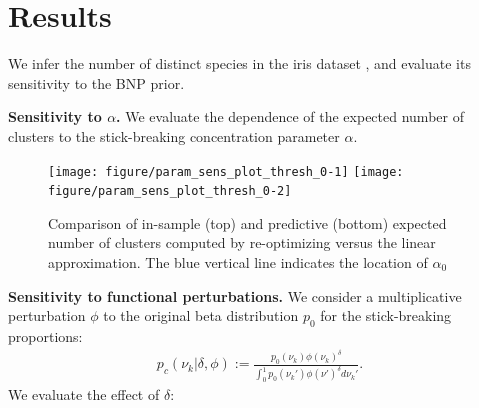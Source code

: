 \documentclass[a0,plainsections,30pt]{sciposter}\usepackage[]{graphicx}\usepackage[]{color}
\newenvironment{knitrout}{}{} %
\newcommand{\Expect}{\mathbb{E}}
\newcommand{\etazopt}{\eta_z^{*}}
\newcommand{\etathetaopt}{\eta_\theta^{*}}
\newcommand{\QExpect}
{\Expect_{q\left(\theta, z \vert \eta_\theta, \etazopt(\eta_\theta)\right)}}
\begin{document}
\begin{minipage}[t]{0.45\textwidth}




\section*{Results}
\vspace{-0.3in}
We infer the number of distinct species in the iris
dataset \cite{iris_data_anderson}, and evaluate its sensitivity to the BNP prior.  
\vspace{0.1in}

{\bf \large Sensitivity to $\alpha$.}
We evaluate the dependence of the expected number of clusters to the stick-breaking concentration parameter $\alpha$. 





\begin{figure}
\centering
\begin{knitrout}
\color{fgcolor}

{\centering \texttt{[image: figure/param\_sens\_plot\_thresh\_0-1]} 
\texttt{[image: figure/param\_sens\_plot\_thresh\_0-2]} 

}



\end{knitrout}
\caption{Comparison of in-sample (top) and predictive (bottom) expected number of clusters computed by re-optimizing versus the linear approximation. 
The blue vertical line indicates the location of $\alpha_0$}
\end{figure}

{\bf \large Sensitivity to functional perturbations. }
We consider a multiplicative perturbation $\phi$ to
the original beta distribution $p_0$ for the stick-breaking proportions:
\vspace{-0.2in}
\begin{align}
\label{eq:expon_perturb}
	p_c(\nu_k \vert \delta, \phi) :=
  \frac{p_{0}(\nu_k)\phi(\nu_k)^\delta}
       {\int_0^1 p_0(\nu_k')\phi(\nu')^\delta d\nu_k'}.
\end{align}
We evaluate the effect of $\delta$:
\vspace{0.1in}
\begin{figure}
\centering


\end{figure}
\end{minipage}
\end{document}
